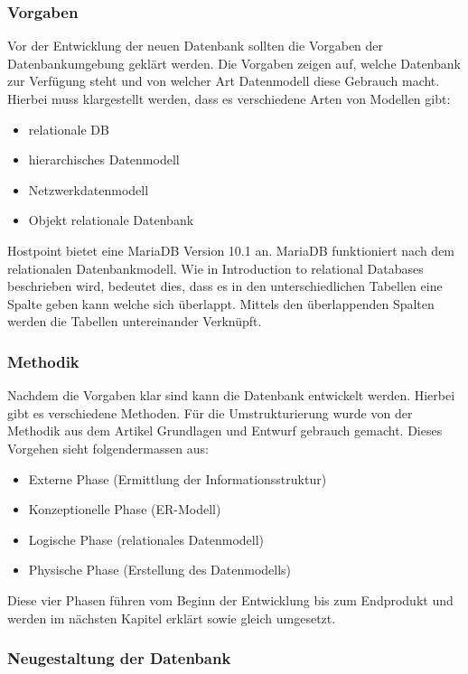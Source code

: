 \subsubsection{Vorgaben}
Vor der Entwicklung der neuen Datenbank sollten die Vorgaben der Datenbankumgebung geklärt werden. Die Vorgaben zeigen auf, welche Datenbank zur Verfügung steht und von welcher Art Datenmodell diese Gebrauch macht. Hierbei muss klargestellt werden, dass es verschiedene Arten von Modellen gibt:
\begin{itemize}
\item relationale DB
\item hierarchisches Datenmodell
\item Netzwerkdatenmodell
\item Objekt relationale Datenbank
\end{itemize}

Hostpoint bietet eine MariaDB Version 10.1 an. MariaDB funktioniert nach dem relationalen Datenbankmodell. Wie in Introduction to relational Databases \cite{IntroductionToRelationalDatabases:MariaDB} beschrieben wird, bedeutet dies, dass es in den unterschiedlichen Tabellen eine Spalte geben kann welche sich überlappt. Mittels den überlappenden Spalten werden die Tabellen untereinander Verknüpft.\\

\subsubsection{Methodik}
Nachdem die Vorgaben klar sind kann die Datenbank entwickelt werden. Hierbei gibt es verschiedene Methoden. Für die Umstrukturierung wurde von der Methodik aus dem Artikel Grundlagen und Entwurf \cite{Datenbanken:GrundlagenUndEntwurf:VeikkoKrypczyk} gebrauch gemacht. Dieses Vorgehen sieht folgendermassen aus:
\begin{itemize}
\item Externe Phase (Ermittlung der Informationsstruktur)
\item Konzeptionelle Phase (ER-Modell)
\item Logische Phase (relationales Datenmodell)
\item Physische Phase (Erstellung des Datenmodells)
\end{itemize}

Diese vier Phasen führen vom Beginn der Entwicklung bis zum Endprodukt und werden im nächsten Kapitel erklärt sowie gleich umgesetzt.
\subsubsection{Neugestaltung der Datenbank}
